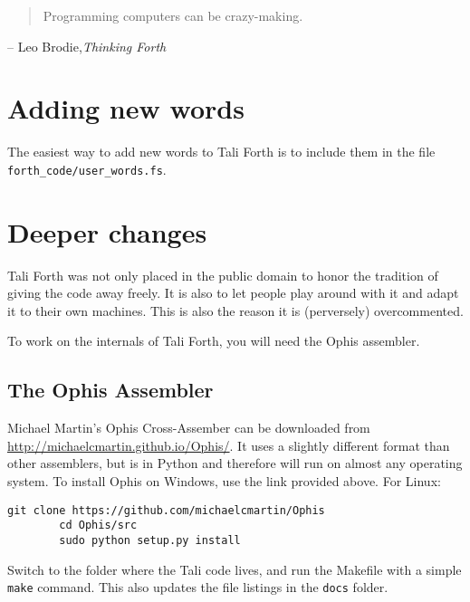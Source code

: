 
\begin{quote}
        Programming computers can be crazy-making.
\end{quote}
\begin{flushright}
        -- Leo Brodie,\textit{Thinking Forth}\cite{brodie84}
\end{flushright}



\section{Adding new words}

The easiest way to add new words to Tali Forth is to include them in the file
\texttt{forth\_code/user\_words.fs}. 


\section{Deeper changes}

Tali Forth was not only placed in the public domain to honor the tradition of
giving the code away freely. It is also to let people play around with it and
adapt it to their own machines. This is also the reason it is (perversely)
overcommented.

To work on the internals of Tali Forth, you will need the Ophis assembler.

\subsection{The Ophis Assembler}

Michael Martin's Ophis Cross-Assember can be downloaded from
\href{http://michaelcmartin.github.io/Ophis/}{http://michaelcmartin.github.io/Ophis/}.
It uses a slightly different format than other assemblers, but is in
Python and
therefore will run on almost any operating system. To install Ophis on Windows,
use the link provided above. For Linux:

\begin{lstlisting}[frame=lines]
        git clone https://github.com/michaelcmartin/Ophis
        cd Ophis/src
        sudo python setup.py install
\end{lstlisting}

Switch to the folder where the Tali code lives, and run the Makefile with a
simple \texttt{make} command. This also updates the file listings in the
\texttt{docs} folder. 

